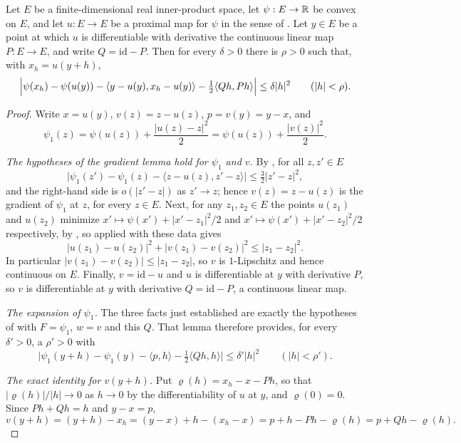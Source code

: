 \begin{lemma}
Let $E$ be a finite-dimensional real inner-product space, let $\psi:E\to\mathbb{R}$ be
convex on $E$, and let $u:E\to E$ be a proximal map for $\psi$ in the sense of
. Let $y\in E$ be a point at which $u$ is differentiable
with derivative the continuous linear map $P:E\to E$, and write
$Q=\mathrm{id}-P$. Then for every $\delta>0$ there is $\rho>0$ such that, with
$x_h=u(y+h)$,
\[
  \Bigl|\psi(x_h)-\psi(u(y))-\langle y-u(y),x_h-u(y)\rangle
     -\tfrac12\langle Qh,Ph\rangle\Bigr|\le\delta|h|^2\qquad(|h|<\rho).
\]
\end{lemma}
\begin{proof}
Write $x=u(y)$, $v(z)=z-u(z)$, $p=v(y)=y-x$, and
\[
  \psi_1(z)=\psi(u(z))+\frac{|u(z)-z|^2}{2}=\psi(u(z))+\frac{|v(z)|^2}{2} .
\]

\emph{The hypotheses of the gradient lemma hold for $\psi_1$ and $v$.}
By , for all $z,z'\in E$
\[
  \bigl|\psi_1(z')-\psi_1(z)-\langle z-u(z),z'-z\rangle\bigr|
    \le\tfrac32|z'-z|^2 ,
\]
and the right-hand side is $o(|z'-z|)$ as $z'\to z$; hence $v(z)=z-u(z)$ is the
gradient of $\psi_1$ at $z$, for every $z\in E$. Next, for any $z_1,z_2\in E$
the points $u(z_1)$ and $u(z_2)$ minimize $x'\mapsto\psi(x')+|x'-z_1|^2/2$ and
$x'\mapsto\psi(x')+|x'-z_2|^2/2$ respectively, by , so
 applied with these data gives
\begin{equation}\label{eq:mce-firm}
  |u(z_1)-u(z_2)|^2+|v(z_1)-v(z_2)|^2\le|z_1-z_2|^2 .
\end{equation}
In particular $|v(z_1)-v(z_2)|\le|z_1-z_2|$, so $v$ is $1$-Lipschitz and hence
continuous on $E$. Finally, $v=\mathrm{id}-u$ and $u$ is differentiable at $y$
with derivative $P$, so $v$ is differentiable at $y$ with derivative
$Q=\mathrm{id}-P$, a continuous linear map.

\emph{The expansion of $\psi_1$.}
The three facts just established are exactly the hypotheses of
 with $F=\psi_1$, $w=v$ and this $Q$. That
lemma therefore provides, for every $\delta'>0$, a $\rho'>0$ with
\begin{equation}\label{eq:mce-psi1}
  \bigl|\psi_1(y+h)-\psi_1(y)-\langle p,h\rangle-\tfrac12\langle Qh,h\rangle\bigr|
   \le\delta'|h|^2\qquad(|h|<\rho') .
\end{equation}

\emph{The exact identity for $v(y+h)$.}
Put $\varrho(h)=x_h-x-Ph$, so that $|\varrho(h)|/|h|\to0$ as $h\to0$ by the
differentiability of $u$ at $y$, and $\varrho(0)=0$. Since $Ph+Qh=h$ and
$y-x=p$,
\begin{equation}\label{eq:mce-vexact}
  v(y+h)=(y+h)-x_h=(y-x)+h-(x_h-x)=p+h-Ph-\varrho(h)=p+Qh-\varrho(h).
\end{equation}


\end{proof}

